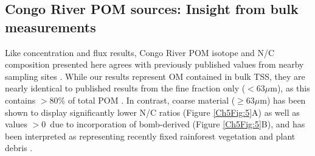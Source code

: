 \subsection{Congo River POM sources: Insight from bulk measurements}

Like concentration and flux results, Congo River POM isotope and N/C composition presented here agrees with previously published values from nearby sampling sites \citep{Mariotti:1991vx,Spencer:2012en,Spencer:2016ho}. While our results represent OM contained in bulk TSS, they are nearly identical to published results from the fine fraction only ($<63 \mu$m), as this contains $>80$\% of total POM \citep{Spencer:2012en}. In contrast, coarse material ($\geq63 \mu$m) has been shown to display significantly lower N/C ratios (Figure \ref{Ch5Fig:5}A) as well as  values $>0$\textperthousand\ due to incorporation of bomb-derived  (Figure \ref{Ch5Fig:5}B), and has been interpreted as representing recently fixed rainforest vegetation and plant debris \citep{Spencer:2012en}. 

